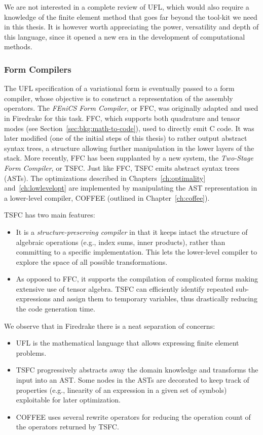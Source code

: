 We are not interested in a complete review of UFL, which would also require a knowledge of the finite element method that goes far beyond the tool-kit we need in this thesis. It is however worth appreciating the power, versatility and depth of this language, since it opened a new era in the development of computational methods.


\subsubsection{Form Compilers}
The UFL specification of a variational form is eventually passed to a form compiler, whose objective is to construct a representation of the assembly operators. The {\em FEniCS Form Compiler}, or FFC, was originally adapted and used in Firedrake for this task. FFC, which supports both quadrature and tensor modes (see Section~\ref{sec:bkg:math-to-code}), used to directly emit C code. It was later modified (one of the initial steps of this thesis) to rather output abstract syntax trees, a structure allowing further manipulation in the lower layers of the stack. More recently, FFC has been supplanted by a new system, the {\em Two-Stage Form Compiler}, or TSFC. Just like FFC, TSFC emits abstract syntax trees (ASTs). The optimizations described in Chapters~\ref{ch:optimality} and~\ref{ch:lowlevelopt} are implemented by manipulating the AST representation in a lower-level compiler, COFFEE (outlined in Chapter~\ref{ch:coffee}). 

TSFC has two main features:
\begin{itemize}
\item It is a \textit{structure-preserving compiler} in that it keeps intact the structure of algebraic operations (e.g., index sums, inner products), rather than committing to a specific implementation. This lets the lower-level compiler to explore the space of all possible transformations.
\item As opposed to FFC, it supports the compilation of complicated forms making extensive use of tensor algebra. TSFC can efficiently identify repeated sub-expressions and assign them to temporary variables, thus drastically reducing the code generation time.
\end{itemize}

We observe that in Firedrake there is a neat separation of concerns:
\begin{itemize}
\item UFL is the mathematical language that allows expressing finite element problems.
\item TSFC progressively abstracts away the domain knowledge and transforms the input into an AST. Some nodes in the ASTs are decorated to keep track of properties (e.g., linearity of an expression in a given set of symbols) exploitable for later optimization.
\item COFFEE uses several rewrite operators for reducing the operation count of the operators returned by TSFC. 
\end{itemize}

